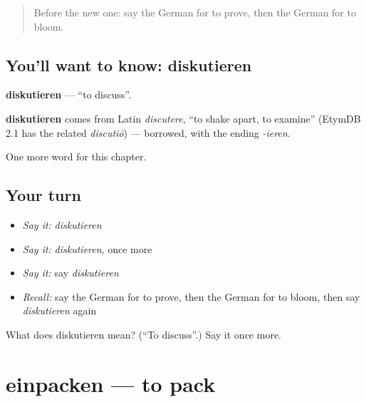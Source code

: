 \label{lesson:GE-C247-diskutieren}



\begin{quote}
Before the new one: say the German for to prove, then the German for to bloom.
\end{quote}

\subsection*{You'll want to know: diskutieren}
\textbf{diskutieren} — \textquotedblleft{}to discuss\textquotedblright{}.

\begin{cousinweb}
\textbf{diskutieren} comes from Latin \emph{discutere}, \textquotedblleft{}to shake apart, to examine\textquotedblright{} (EtymDB 2.1 has the related \emph{discutiō}) — borrowed, with the ending \emph{-ieren}.
\end{cousinweb}

\begin{grammarlens}[title={What you've built}]
One more word for this chapter.
\end{grammarlens}

\subsection*{Your turn}
\begin{itemize}
\raggedright
  \item \emph{Say it:} \emph{diskutieren}
  \item \emph{Say it:} \emph{diskutieren}, once more
  \item \emph{Say it:} say \emph{diskutieren}
  \item \emph{Recall:} say the German for to prove, then the German for to bloom, then say \emph{diskutieren} again
\end{itemize}

\begin{tcolorbox}[breakable,colback=teal!4,colframe=teal!35!black,title={Before you move on}]
What does diskutieren mean? (\textquotedblleft{}To discuss\textquotedblright{}.) Say it once more.
\end{tcolorbox}
\section[einpacken]{einpacken — to pack}

\label{lesson:GE-C247-einpacken}



